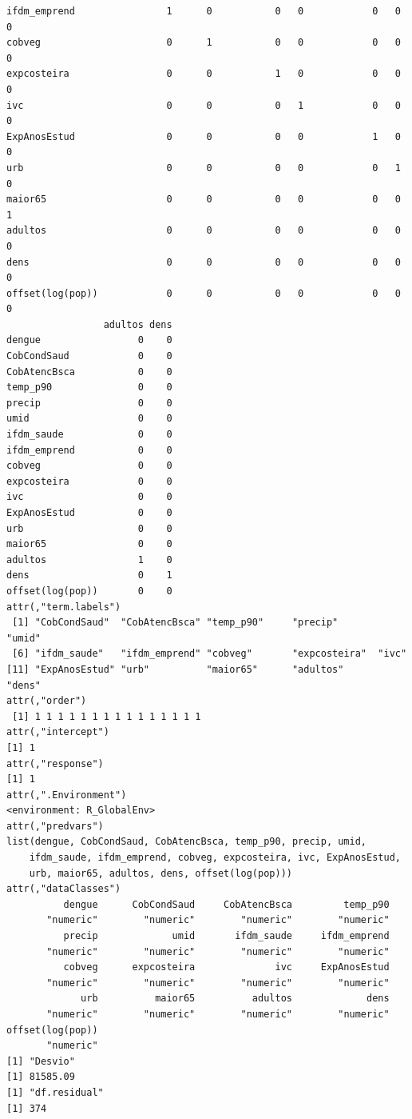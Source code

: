 \documentclass[12pt,a4paper]{article}\usepackage[]{graphicx}\usepackage[]{color}
\makeatletter
\newenvironment{kframe}{%
 \def\at@end@of@kframe{}%
 \ifinner\ifhmode%
  \def\at@end@of@kframe{\end{minipage}}%
  \begin{minipage}{\columnwidth}%
 \fi\fi%
 \def\FrameCommand##1{\hskip\@totalleftmargin \hskip-\fboxsep
 \colorbox{shadecolor}{##1}\hskip-\fboxsep
     \hskip-\linewidth \hskip-\@totalleftmargin \hskip\columnwidth}%
 \MakeFramed {\advance\hsize-\width
   \@totalleftmargin\z@ \linewidth\hsize
   \@setminipage}}%
 {\par\unskip\endMakeFramed%
 \at@end@of@kframe}
\newenvironment{knitrout}{}{} %
\makeatother
\begin{document}
\begin{knitrout}
\begin{kframe}
\begin{verbatim}
ifdm_emprend                1      0           0   0            0   0       0
cobveg                      0      1           0   0            0   0       0
expcosteira                 0      0           1   0            0   0       0
ivc                         0      0           0   1            0   0       0
ExpAnosEstud                0      0           0   0            1   0       0
urb                         0      0           0   0            0   1       0
maior65                     0      0           0   0            0   0       1
adultos                     0      0           0   0            0   0       0
dens                        0      0           0   0            0   0       0
offset(log(pop))            0      0           0   0            0   0       0
                 adultos dens
dengue                 0    0
CobCondSaud            0    0
CobAtencBsca           0    0
temp_p90               0    0
precip                 0    0
umid                   0    0
ifdm_saude             0    0
ifdm_emprend           0    0
cobveg                 0    0
expcosteira            0    0
ivc                    0    0
ExpAnosEstud           0    0
urb                    0    0
maior65                0    0
adultos                1    0
dens                   0    1
offset(log(pop))       0    0
attr(,"term.labels")
 [1] "CobCondSaud"  "CobAtencBsca" "temp_p90"     "precip"       "umid"        
 [6] "ifdm_saude"   "ifdm_emprend" "cobveg"       "expcosteira"  "ivc"         
[11] "ExpAnosEstud" "urb"          "maior65"      "adultos"      "dens"        
attr(,"order")
 [1] 1 1 1 1 1 1 1 1 1 1 1 1 1 1 1
attr(,"intercept")
[1] 1
attr(,"response")
[1] 1
attr(,".Environment")
<environment: R_GlobalEnv>
attr(,"predvars")
list(dengue, CobCondSaud, CobAtencBsca, temp_p90, precip, umid, 
    ifdm_saude, ifdm_emprend, cobveg, expcosteira, ivc, ExpAnosEstud, 
    urb, maior65, adultos, dens, offset(log(pop)))
attr(,"dataClasses")
          dengue      CobCondSaud     CobAtencBsca         temp_p90 
       "numeric"        "numeric"        "numeric"        "numeric" 
          precip             umid       ifdm_saude     ifdm_emprend 
       "numeric"        "numeric"        "numeric"        "numeric" 
          cobveg      expcosteira              ivc     ExpAnosEstud 
       "numeric"        "numeric"        "numeric"        "numeric" 
             urb          maior65          adultos             dens 
       "numeric"        "numeric"        "numeric"        "numeric" 
offset(log(pop)) 
       "numeric" 
[1] "Desvio"
[1] 81585.09
[1] "df.residual"
[1] 374
\end{verbatim}
\end{kframe}
\end{knitrout}
\end{document}
